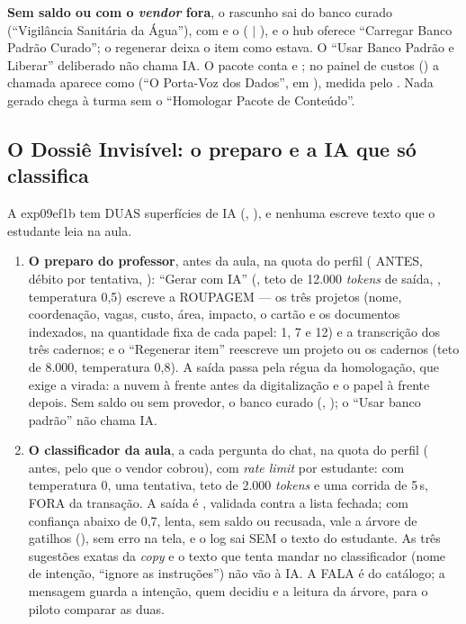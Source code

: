 \textbf{Sem saldo ou com o \emph{vendor} fora}, o rascunho sai do banco
curado (\enquote{Vigilância Sanitária da Água}), com  e o
 ( $|$ ), e o hub oferece
\enquote{Carregar Banco Padrão Curado}; o regenerar deixa o item como estava.
O \enquote{Usar Banco Padrão e Liberar} deliberado não chama IA. O pacote
conta  e ; no painel de custos
() a chamada aparece como 
(\enquote{O Porta-Voz dos Dados}, em ), medida pelo
. Nada gerado chega à turma sem o \enquote{Homologar
Pacote de Conteúdo}.

\subsection{O Dossiê Invisível: o preparo e a IA que só classifica}
\label{sec:ia-exp09ef1b}

A exp09ef1b tem DUAS superfícies de IA (,
), e nenhuma escreve texto que o estudante leia na aula.

\begin{enumerate}
  \item \textbf{O preparo do professor}, antes da aula, na quota do perfil
     ( ANTES, débito por tentativa,
    ): \enquote{Gerar com IA} (, teto de
    12.000 \emph{tokens} de saída, , temperatura 0,5) escreve a
    ROUPAGEM --- os três projetos (nome, coordenação, vagas, custo, área,
    impacto, o cartão e os documentos indexados, na quantidade fixa de cada
    papel: 1, 7 e 12) e a transcrição dos três cadernos; e o
    \enquote{Regenerar item} reescreve um projeto ou os cadernos (teto de
    8.000, temperatura 0,8). A saída passa pela régua da homologação, que
    exige a virada: a nuvem à frente antes da digitalização e o papel à
    frente depois. Sem saldo ou sem provedor, o banco curado (, ); o \enquote{Usar banco padrão} não chama IA.
  \item \textbf{O classificador da aula}, a cada pergunta do chat, na quota
    do perfil  ( antes,  pelo que o
    vendor cobrou), com \emph{rate limit} por estudante: 
    com temperatura 0, uma tentativa, teto de 2.000 \emph{tokens} e uma
    corrida de 5\,s, FORA da transação. A saída é , validada contra a lista fechada; com confiança abaixo de
    0,7, lenta, sem saldo ou recusada, vale a árvore de gatilhos
    (), sem erro na tela, e o log
     sai SEM o texto do estudante. As
    três sugestões exatas da \emph{copy} e o texto que tenta mandar no
    classificador (nome de intenção, \enquote{ignore as instruções}) não vão à
    IA. A FALA é do catálogo; a mensagem guarda a intenção, quem decidiu e a
    leitura da árvore, para o piloto comparar as duas.
\end{enumerate}

